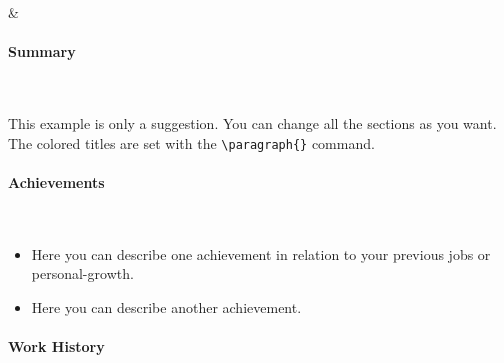\documentclass[color]{resume-twopanels}
\begin{document}
\begin{resume}
\begin{leftpanel}
    \end{leftpanel}
    & %
    \begin{rightpanel}

        \paragraph{Summary} \ \vspace{1em}  %

            This example is only a suggestion.
            You can change all the sections as you want.
            The colored titles are set with the \verb*|\paragraph{}| command.
            \lipsum[75]
            \newline


        \paragraph{Achievements} \ \vspace{1em}  %

            \begin{itemize}
                \item Here you can describe one achievement in relation to your previous jobs or personal-growth.
                \item Here you can describe another achievement.
            \end{itemize}


        \paragraph{Work History}

            \begin{itemize}


\end{itemize}
\end{rightpanel}
\end{resume}
\end{document}
